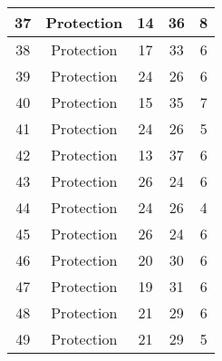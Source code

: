 \documentclass[results.tex]{subfiles}
\begin{document}
\begin{center}
\begin{tabular}{| c || c | c | c | c |}
            \hline
            37                      & Protection                   & 14                     & 36                      & 8                    \\
            \hline
            38                      & Protection                   & 17                     & 33                      & 6                    \\
            \hline
            39                      & Protection                   & 24                     & 26                      & 6                    \\
            \hline
            40                      & Protection                   & 15                     & 35                      & 7                    \\
            \hline
            41                      & Protection                   & 24                     & 26                      & 5                    \\
            \hline
            42                      & Protection                   & 13                     & 37                      & 6                    \\
            \hline
            43                      & Protection                   & 26                     & 24                      & 6                    \\
            \hline
            44                      & Protection                   & 24                     & 26                      & 4                    \\
            \hline
            45                      & Protection                   & 26                     & 24                      & 6                    \\
            \hline
            46                      & Protection                   & 20                     & 30                      & 6                    \\
            \hline
            47                      & Protection                   & 19                     & 31                      & 6                    \\
            \hline
            48                      & Protection                   & 21                     & 29                      & 6                    \\
            \hline
            49                      & Protection                   & 21                     & 29                      & 5                    \\
            \hline
        \end{tabular}
    \end{center}
\end{document}
